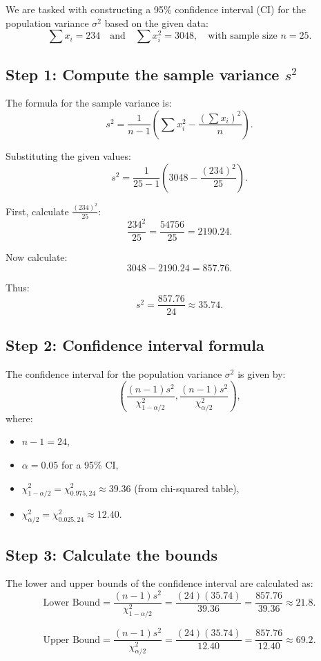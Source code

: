\documentclass{article}
\begin{document}
We are tasked with constructing a 95\% confidence interval (CI) for the population variance \(\sigma^2\) based on the given data:
\[
\sum x_i = 234 \quad \text{and} \quad \sum x_i^2 = 3048, \quad \text{with sample size } n = 25.
\]

\subsection*{Step 1: Compute the sample variance \(s^2\)}
The formula for the sample variance is:
\[
s^2 = \frac{1}{n-1} \left( \sum x_i^2 - \frac{(\sum x_i)^2}{n} \right).
\]

Substituting the given values:
\[
s^2 = \frac{1}{25-1} \left( 3048 - \frac{(234)^2}{25} \right).
\]

First, calculate \(\frac{(234)^2}{25}\):
\[
\frac{234^2}{25} = \frac{54756}{25} = 2190.24.
\]

Now calculate:
\[
3048 - 2190.24 = 857.76.
\]

Thus:
\[
s^2 = \frac{857.76}{24} \approx 35.74.
\]

\subsection*{Step 2: Confidence interval formula}
The confidence interval for the population variance \(\sigma^2\) is given by:
\[
\left( \frac{(n-1)s^2}{\chi^2_{1-\alpha/2}}, \frac{(n-1)s^2}{\chi^2_{\alpha/2}} \right),
\]
where:
\begin{itemize}
    \item \(n-1 = 24\),
    \item \(\alpha = 0.05\) for a 95\% CI,
    \item \(\chi^2_{1-\alpha/2} = \chi^2_{0.975, 24} \approx 39.36\) (from chi-squared table),
    \item \(\chi^2_{\alpha/2} = \chi^2_{0.025, 24} \approx 12.40\).
\end{itemize}

\subsection*{Step 3: Calculate the bounds}
The lower and upper bounds of the confidence interval are calculated as:
\[
\text{Lower Bound} = \frac{(n-1)s^2}{\chi^2_{1-\alpha/2}} = \frac{(24)(35.74)}{39.36} = \frac{857.76}{39.36} \approx 21.8.
\]

\[
\text{Upper Bound} = \frac{(n-1)s^2}{\chi^2_{\alpha/2}} = \frac{(24)(35.74)}{12.40} = \frac{857.76}{12.40} \approx 69.2.
\]
\end{document}
